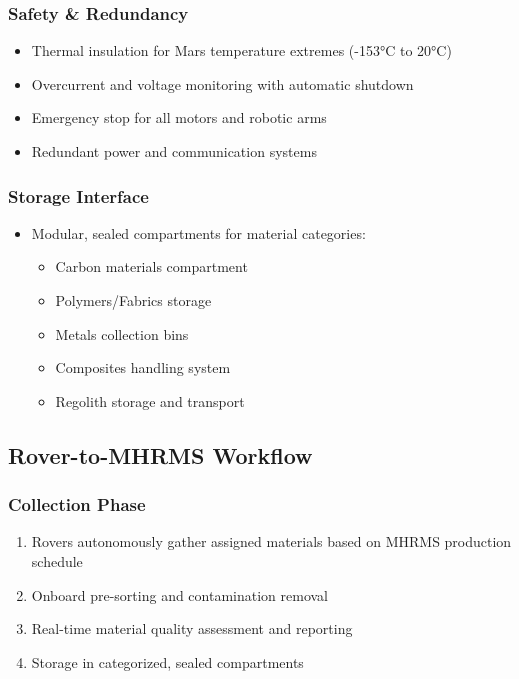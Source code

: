 \documentclass[12pt, a4paper]{article}
\begin{document}
\subsubsection{Safety \& Redundancy}
\begin{itemize}
    \item Thermal insulation for Mars temperature extremes (-153°C to 20°C)
    \item Overcurrent and voltage monitoring with automatic shutdown
    \item Emergency stop for all motors and robotic arms
    \item Redundant power and communication systems
\end{itemize}

\subsubsection{Storage Interface}
\begin{itemize}
    \item Modular, sealed compartments for material categories:
    \begin{itemize}
        \item Carbon materials compartment
        \item Polymers/Fabrics storage
        \item Metals collection bins
        \item Composites handling system
        \item Regolith storage and transport
    \end{itemize}
\end{itemize}

\subsection{Rover-to-MHRMS Workflow}

\subsubsection{Collection Phase}
\begin{enumerate}
    \item Rovers autonomously gather assigned materials based on MHRMS production schedule
    \item Onboard pre-sorting and contamination removal
    \item Real-time material quality assessment and reporting
    \item Storage in categorized, sealed compartments
\end{enumerate}
\end{document}
